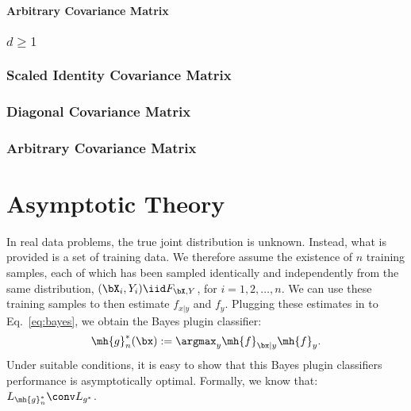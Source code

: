 \documentclass[10pt]{article}
\begin{document}
\paragraph{Arbitrary Covariance Matrix}


\subsubsection{$d \geq 1$}
\subsubsection{Scaled Identity Covariance Matrix}
\subsubsection{Diagonal Covariance Matrix}
\subsubsection{Arbitrary Covariance Matrix}




\newpage
\section{Asymptotic Theory}

In real data problems,  the true joint distribution is unknown. Instead, what is provided is a set of training data.  We therefore assume the existence of $n$ training samples, each of which has been sampled identically and independently from the same distribution, $(\bX_i,Y_i) \iid F_{\bX,Y}$, for $i =1,2,\ldots, n$.  We can use these training samples to then estimate $f_{x|y}$ and $f_y$.  Plugging these estimates in to Eq.~\eqref{eq:bayes}, we obtain the Bayes plugin classifier:
\begin{align} \label{eq:plugin}
\mh{g}^*_n(\bx) := \argmax_y \mh{f}_{\bx|y}\mh{f}_y.
\end{align}
Under suitable conditions, it is easy to show that this Bayes plugin classifiers performance is asymptotically optimal.  
Formally, we know that:
$L_{\mh{g}^*_n} \conv L_{g^*}$.
\end{document}
